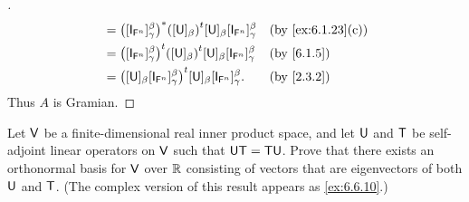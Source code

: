 \begin{proof}[]
\begin{align*}
      & = \pa{[\IT[\vs{F}^n]]_{\gamma}^{\beta}}^* \tp{([\U]_{\beta})} [\U]_{\beta} [\IT[\vs{F}^n]]_{\gamma}^{\beta}    &  & \text{(by \cref{ex:6.1.23}(c))} \\
      & = \tp{\pa{[\IT[\vs{F}^n]]_{\gamma}^{\beta}}} \tp{([\U]_{\beta})} [\U]_{\beta} [\IT[\vs{F}^n]]_{\gamma}^{\beta} &  & \text{(by \cref{6.1.5})}        \\
      & = \tp{\pa{[\U]_{\beta} [\IT[\vs{F}^n]]_{\gamma}^{\beta}}} [\U]_{\beta} [\IT[\vs{F}^n]]_{\gamma}^{\beta}.       &  & \text{(by \cref{2.3.2})}
  \end{align*}
  Thus \(A\) is Gramian.
\end{proof}

\begin{ex}\label{ex:6.4.14}
  Let \(\mathsf{V}\) be a finite-dimensional real inner product space, and let \(\mathsf{U}\) and \(\mathsf{T}\) be self-adjoint linear operators on \(\mathsf{V}\) such that \(\mathsf{U} \mathsf{T} = \mathsf{T} \mathsf{U}\).
  Prove that there exists an orthonormal basis for \(\mathsf{V}\) over \(\mathbb{R}\) consisting of vectors that are eigenvectors of both \(\mathsf{U}\) and \(\mathsf{T}\).
  (The complex version of this result appears as \cref{ex:6.6.10}.)
\end{ex}

